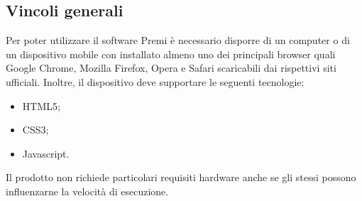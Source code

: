 {\subsection{Vincoli generali}{
	Per poter utilizzare il software Premi è necessario disporre di un computer o di un dispositivo mobile con installato almeno uno dei principali browser quali Google Chrome, Mozilla Firefox, Opera e Safari scaricabili dai rispettivi siti ufficiali. Inoltre, il dispositivo deve supportare le seguenti tecnologie:
	\begin{itemize}
		\item HTML5;
		\item CSS3;
		\item Javascript.
	\end{itemize}
	Il prodotto non richiede particolari requisiti hardware anche se gli stessi possono influenzarne la velocità di esecuzione.
	}
}